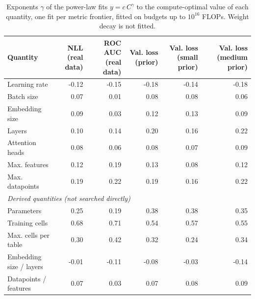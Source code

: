 \begin{table}[t]
  \centering
  \small
  \begin{tabular}{lrrrrr}
    \hline
    Quantity & NLL (real data) & ROC AUC (real data) & Val. loss (prior) & Val. loss (small prior) & Val. loss (medium prior) \\
    \hline
    Learning rate & -0.12 & -0.15 & -0.18 & -0.14 & -0.18 \\
    Batch size & 0.07 & 0.01 & 0.08 & 0.08 & 0.06 \\
    Embedding size & 0.09 & 0.03 & 0.12 & 0.13 & 0.09 \\
    Layers & 0.10 & 0.14 & 0.20 & 0.16 & 0.22 \\
    Attention heads & 0.08 & 0.06 & 0.08 & 0.07 & 0.09 \\
    Max. features & 0.12 & 0.19 & 0.13 & 0.08 & 0.12 \\
    Max. datapoints & 0.19 & 0.22 & 0.19 & 0.16 & 0.22 \\
    \hline
    \multicolumn{6}{l}{\emph{Derived quantities (not searched directly)}} \\
    \hline
    Parameters & 0.25 & 0.19 & 0.38 & 0.38 & 0.35 \\
    Training cells & 0.68 & 0.71 & 0.54 & 0.57 & 0.55 \\
    Max. cells per table & 0.30 & 0.42 & 0.32 & 0.24 & 0.34 \\
    Embedding size / layers & -0.01 & -0.11 & -0.08 & -0.03 & -0.14 \\
    Datapoints / features & 0.07 & 0.03 & 0.07 & 0.08 & 0.09 \\
    \hline
  \end{tabular}
  \caption{Exponents $\gamma$ of the power-law fits $y = c\,C^{\gamma}$ to the compute-optimal value of each quantity, one fit per metric frontier, fitted on budgets up to $10^{16}$ FLOPs. Weight decay is not fitted.}
  \label{tab:trend_exponents}
\end{table}
